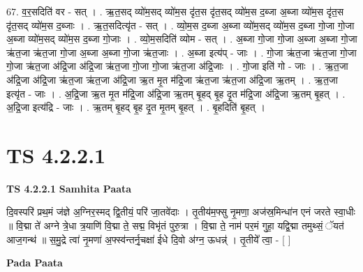 \documentclass[17pt]{extarticle}
\begin{document}
67. व॒र॒सदिति॑ वर - सत् । . ऋ॒त॒सद् व्यो॑म॒सद् व्यो॑म॒स दृ॑त॒स दृ॑त॒सद् व्यो॑म॒स द॒ब्जा अ॒ब्जा व्यो॑म॒स दृ॑त॒स दृ॑त॒सद् व्यो॑म॒स द॒ब्जाः । . ऋ॒त॒सदित्यृ॑त - सत् । . व्यो॒म॒स द॒ब्जा अ॒ब्जा व्यो॑म॒सद् व्यो॑म॒स द॒ब्जा गो॒जा गो॒जा अ॒ब्जा व्यो॑म॒सद् व्यो॑म॒स द॒ब्जा गो॒जाः । . व्यो॒म॒सदिति॑ व्योम - सत् । . अ॒ब्जा गो॒जा गो॒जा अ॒ब्जा अ॒ब्जा गो॒जा ऋ॑त॒जा ऋ॑त॒जा गो॒जा अ॒ब्जा अ॒ब्जा गो॒जा ऋ॑त॒जाः । . अ॒ब्जा इत्य॑प् - जाः । . गो॒जा ऋ॑त॒जा ऋ॑त॒जा गो॒जा गो॒जा ऋ॑त॒जा अ॑द्रि॒जा अ॑द्रि॒जा ऋ॑त॒जा गो॒जा गो॒जा ऋ॑त॒जा अ॑द्रि॒जाः । . गो॒जा इति॑ गो - जाः । . ऋ॒त॒जा अ॑द्रि॒जा अ॑द्रि॒जा ऋ॑त॒जा ऋ॑त॒जा अ॑द्रि॒जा ऋ॒त मृ॒त म॑द्रि॒जा ऋ॑त॒जा ऋ॑त॒जा अ॑द्रि॒जा ऋ॒तम् । . ऋ॒त॒जा इत्यृ॑त - जाः । . अ॒द्रि॒जा ऋ॒त मृ॒त म॑द्रि॒जा अ॑द्रि॒जा ऋ॒तम् बृ॒हद् बृ॒ह दृ॒त म॑द्रि॒जा अ॑द्रि॒जा ऋ॒तम् बृ॒हत् । . अ॒द्रि॒जा इत्य॑द्रि - जाः । . ऋ॒तम् बृ॒हद् बृ॒ह दृ॒त मृ॒तम् बृ॒हत् । . बृ॒हदिति॑ बृ॒हत् । \newline
\pagebreak
{}

\section{ TS 4.2.2.1 }

\textbf{TS 4.2.2.1 } \newline
\textbf{Samhita Paata} \newline

दि॒वस्परि॑ प्रथ॒मं ज॑ज्ञे अ॒ग्निर॒स्मद् द्वि॒तीयं॒ परि॑ जा॒तवे॑दाः । तृ॒तीय॑म॒फ्सु नृ॒मणा॒ अज॑स्र॒मिन्धा॑न एनं जरते स्वा॒धीः ॥ वि॒द्मा ते॑ अग्ने त्रे॒धा त्र॒याणि॑ वि॒द्मा ते॒ सद्म॒ विभृ॑तं पुरु॒त्रा । वि॒द्मा ते॒ नाम॑ पर॒मं गुहा॒ यद्वि॒द्मा तमुथ्सं॒ ॅयत॑ आज॒गन्थ॑ ॥ स॒मु॒द्रे त्वा॑ नृ॒मणा॑ अ॒फ्स्व॑न्तर्नृ॒चक्षा॑ ईधे दि॒वो अ॑ग्न॒ ऊधन्न्॑ । तृ॒तीये᳚ त्वा॒ - [  ] \newline

\textbf{Pada Paata} \newline
\end{document}
